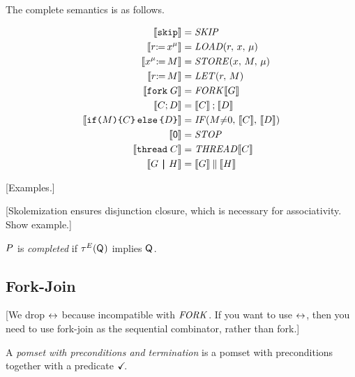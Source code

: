 The complete semantics is as follows.
\begin{scope}
  \allowdisplaybreaks
  \begin{align*}
    \sem{\SKIP} &= \sSKIP
    \\
    \sem{\PR[\amode]{\aLoc}{\aReg}} &= \sLOAD[\amode]{\aReg}{\aLoc}
    \\
    \sem{\PW[\amode]{\aLoc}{\aExp}} &= \sSTORE[\amode]{\aLoc}{\aExp}
    \\
    \sem{\LET{\aReg}{\aExp}} &= \sLET{\aReg}{\aExp}
    \\
    \sem{\FORK{\aGrp}} &= \sFORK{}\sem{\aGrp}
    \\
    \sem{\aCmd \SEMI \bCmd} &= \sem{\aCmd}\sSEMI\sem{\bCmd}
    \\
    \sem{\IF{\aExp}\THEN\aCmd\ELSE\bCmd\FI} &= \sIF{\aExp{\neq}0}\sTHEN\sem{\aCmd}\sELSE\sem{\bCmd}\sFI
    \\
    \sem{\NIL} &= \sSTOP
    \\
    \sem{\THREAD{\aCmd}} &= \sTHREAD{}\sem{\aCmd}
    \\
    \sem{\aGrp \PAR \bGrp} &= \sem{\aGrp}\sPAR\sem{\bGrp}
  \end{align*}
\end{scope}
[Examples.]








[Skolemization ensures disjunction closure, which is necessary
for associativity. Show example.]

\begin{definition}
  $\aPS$ is \emph{completed} if $\aTr[\aEvs](\Q{})$ implies $\Q{}$.
\end{definition}

\subsection{Fork-Join}

[We drop $\reorder$ because incompatible with $\sFORK{}$.  If you want to use
$\reorder$, then you need to use fork-join as the sequential combinator,
rather than fork.]

\begin{definition}
  A \emph{pomset with preconditions and termination} is
  a pomset with preconditions together with a predicate $\TICK$.
\end{definition}


